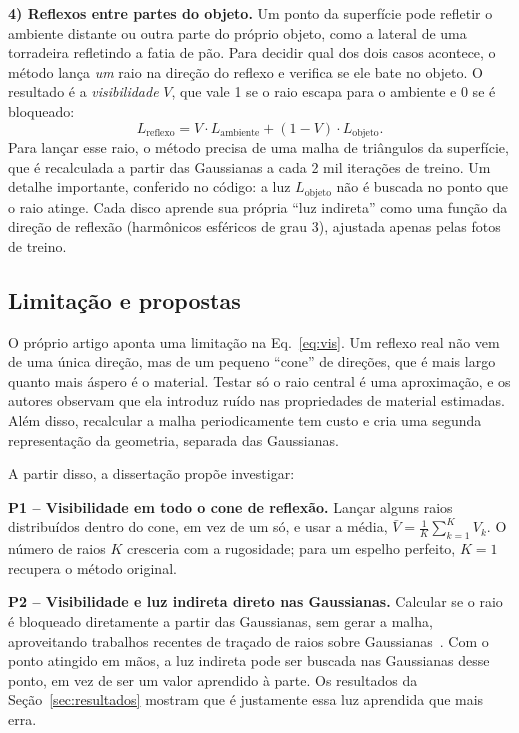 \documentclass[conference]{IEEEtran}
\begin{document}
\textbf{4) Reflexos entre partes do objeto.} Um ponto da superfície pode refletir o ambiente distante ou outra parte do próprio objeto, como a lateral de uma torradeira refletindo a fatia de pão. Para decidir qual dos dois casos acontece, o método lança \emph{um} raio na direção do reflexo e verifica se ele bate no objeto. O resultado é a \emph{visibilidade} $V$, que vale 1 se o raio escapa para o ambiente e 0 se é bloqueado:
\begin{equation}
L_{\text{reflexo}} = V \cdot L_{\text{ambiente}} + (1-V) \cdot L_{\text{objeto}} .
\label{eq:vis}
\end{equation}
Para lançar esse raio, o método precisa de uma malha de triângulos da superfície, que é recalculada a partir das Gaussianas a cada 2 mil iterações de treino. Um detalhe importante, conferido no código: a luz $L_{\text{objeto}}$ não é buscada no ponto que o raio atinge. Cada disco aprende sua própria ``luz indireta'' como uma função da direção de reflexão (harmônicos esféricos de grau 3), ajustada apenas pelas fotos de treino.

\subsection{Limitação e propostas}

O próprio artigo aponta uma limitação na Eq.~\eqref{eq:vis}. Um reflexo real não vem de uma única direção, mas de um pequeno ``cone'' de direções, que é mais largo quanto mais áspero é o material. Testar só o raio central é uma aproximação, e os autores observam que ela introduz ruído nas propriedades de material estimadas. Além disso, recalcular a malha periodicamente tem custo e cria uma segunda representação da geometria, separada das Gaussianas.

A partir disso, a dissertação propõe investigar:

\textbf{P1 -- Visibilidade em todo o cone de reflexão.} Lançar alguns raios distribuídos dentro do cone, em vez de um só, e usar a média, $\bar{V} = \frac{1}{K}\sum_{k=1}^{K} V_k$. O número de raios $K$ cresceria com a rugosidade; para um espelho perfeito, $K=1$ recupera o método original.

\textbf{P2 -- Visibilidade e luz indireta direto nas Gaussianas.} Calcular se o raio é bloqueado diretamente a partir das Gaussianas, sem gerar a malha, aproveitando trabalhos recentes de traçado de raios sobre Gaussianas~\cite{moenne2024_3dgrt}. Com o ponto atingido em mãos, a luz indireta pode ser buscada nas Gaussianas desse ponto, em vez de ser um valor aprendido à parte. Os resultados da Seção~\ref{sec:resultados} mostram que é justamente essa luz aprendida que mais erra.
\end{document}
